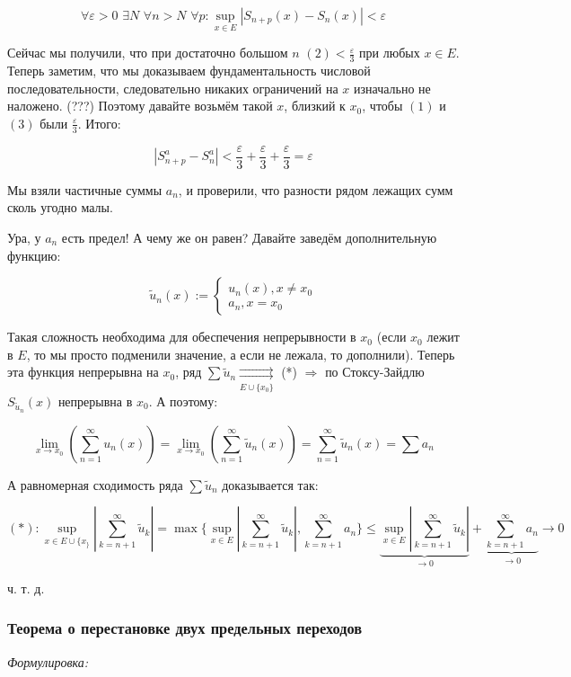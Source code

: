 \documentclass{article}
\def\dbl{\,\,}
\def\rsh#1{\underset{#1}{\rightrightarrows}}
\begin{document}
\[\forall \varepsilon > 0 \dbl \exists N \dbl \forall n > N \dbl \forall p: \sup_{x \in E} \left|S_{n + p}(x) - S_n(x) \right| < \varepsilon\]

Сейчас мы получили, что при достаточно большом $n \dbl (2) < \frac{\varepsilon}{3}$ при любых $x \in E$. Теперь заметим, что мы доказываем фундаментальность числовой последовательности, следовательно никаких ограничений на $x$ изначально не наложено. (???) Поэтому давайте возьмём такой $x$, близкий к $x_0$, чтобы $(1)$ и $(3)$ были $\frac{\varepsilon}{3}$. Итого:

\[|S^a_{n + p} - S^a_n| < \frac{\varepsilon}{3} + \frac{\varepsilon}{3} + \frac{\varepsilon}{3} = \varepsilon\]

Мы взяли частичные суммы $a_n$, и проверили, что разности рядом лежащих сумм сколь угодно малы.

Ура, у $a_n$ есть предел! А чему же он равен? Давайте заведём дополнительную функцию: 

\[\widetilde{u}_n(x) := \begin{cases}
    u_n(x), x \neq x_0\\
    a_n, x = x_0
\end{cases}\]

Такая сложность необходима для обеспечения непрерывности в $x_0$ (если $x_0$ лежит в $E$, то мы просто подменили значение, а если не лежала, то дополнили). Теперь эта функция непрерывна на $x_0$, ряд $\sum \widetilde{u}_n \rsh{E \cup \{x_0\}}$ (*) $ \Rightarrow$ по Стоксу-Зайдлю $S_{\widetilde{u}_n}(x)$ непрерывна в $x_0$. А поэтому:

\[\lim_{x \rightarrow x_0} \left(\sum_{n = 1}^{\infty} u_n(x) \right) = \lim_{x \rightarrow x_0} \left(\sum_{n = 1}^{\infty} \widetilde{u}_n(x) \right) = \sum_{n = 1}^{\infty} \widetilde{u}_n(x) = \sum a_n\]

А равномерная сходимость ряда $\sum \widetilde{u}_n$ доказывается так:

\[(*): \sup_{x \in E \cup \{x_\}} \left|\sum_{k = n + 1}^\infty \widetilde{u}_k \right| = \max\{\sup_{x \in E} \left|\sum_{k = n + 1}^\infty \widetilde{u}_k \right|, \sum_{k = n + 1}^\infty a_n\} \le \underbrace{\sup_{x \in E} \left|\sum_{k = n + 1}^\infty \widetilde{u}_k \right|}_{\rightarrow 0} + \underbrace{\sum_{k = n + 1}^\infty a_n}_{\rightarrow 0} \longrightarrow 0\]

ч. т. д.

\subsubsection{Теорема о перестановке двух предельных переходов}
\textit{Формулировка:}
\end{document}
